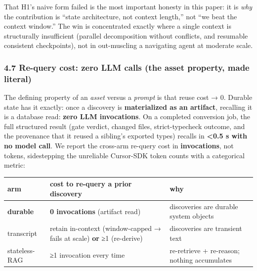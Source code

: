 \documentclass[
  10pt,
]{article}
\newcounter{none} %
\begin{document}
That H1's naive form failed is the most important honesty in this paper:
it is \emph{why} the contribution is ``state architecture, not context
length,'' not ``we beat the context window.'' The win is concentrated
exactly where a single context is structurally insufficient (parallel
decomposition without conflicts, and resumable consistent checkpoints),
not in out-muscling a navigating agent at moderate scale.

\subsubsection{4.7 Re-query cost: zero LLM calls (the asset property,
made
literal)}\label{re-query-cost-zero-llm-calls-the-asset-property-made-literal}

The defining property of an \emph{asset} versus a \emph{prompt} is that
reuse cost → 0. Durable state has it exactly: once a discovery is
\textbf{materialized as an artifact}, recalling it is a database read:
\textbf{zero LLM invocations}. On a completed conversion job, the full
structured result (gate verdict, changed files, strict-typecheck
outcome, and the provenance that it reused a sibling's exported types)
recalls in \textbf{\textless0.5 s with no model call}. We report the
cross-arm re-query cost in \textbf{invocations}, not tokens,
sidestepping the unreliable Cursor-SDK token counts with a categorical
metric:

{\def\LTcaptype{none} %
\begin{longtable}[]{@{}
  >{\raggedright\arraybackslash}p{}
  >{\raggedright\arraybackslash}p{}
  >{\raggedright\arraybackslash}p{}@{}}
\toprule\noalign{}
\begin{minipage}[b]{\linewidth}\raggedright
arm
\end{minipage} & \begin{minipage}[b]{\linewidth}\raggedright
cost to re-query a prior discovery
\end{minipage} & \begin{minipage}[b]{\linewidth}\raggedright
why
\end{minipage} \\
\midrule\noalign{}
\endhead
\bottomrule\noalign{}
\endlastfoot
\textbf{durable} & \textbf{0 invocations} (artifact read) & discoveries
are durable system objects \\
transcript & retain in-context (window-capped → fails at scale)
\textbf{or} ≥1 (re-derive) & discoveries are transient text \\
stateless-RAG & ≥1 invocation every time & re-retrieve + re-reason;
nothing accumulates \\
\end{longtable}
}
\end{document}
